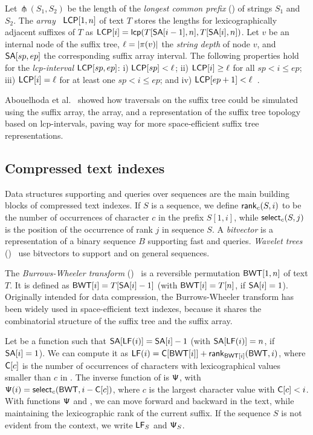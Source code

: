 Let $\mlcp(S_{1}, S_{2})$ be the length of the \emph{longest common prefix}
(\LCP) of strings $S_{1}$ and $S_{2}$. The \LCP{}
\emph{array}~\cite{Manber1993} $\mathsf{LCP}[1,n]$ of text $T$ stores the \LCP{}
lengths for lexicographically adjacent suffixes of $T$ as $\mathsf{LCP}[i] =
\mathsf{lcp}(T[\mathsf{SA}[i-1],n], T[\mathsf{SA}[i],n])$. Let $v$ be an internal node of the
suffix tree, $\ell = \lvert \pi(v) \rvert$ the \emph{string depth} of node $v$, and
$\mathsf{SA}[sp,ep]$ the corresponding suffix array interval. The following
properties hold for the \emph{lcp-interval} $\mathsf{LCP}[sp,ep]$: i) $\mathsf{LCP}[sp] <
\ell$; ii) $\mathsf{LCP}[i] \ge \ell$ for all $sp < i \le ep$; iii) $\mathsf{LCP}[i] = \ell$
for at least one $sp < i \le ep$; and iv) $\mathsf{LCP}[ep+1] <
\ell$~\cite{Abouelhoda2004}.

Abouelhoda et al.~\cite{Abouelhoda2004} showed how traversals on the suffix
tree could be simulated using the suffix array, the \LCP{} array, and a
representation of the suffix tree topology based on lcp-intervals, paving
way for more space-efficient suffix tree representations.

\subsection{Compressed text indexes}

Data structures supporting \rank{} and \select{} queries over sequences are
the main building blocks of compressed text indexes. If $S$ is a sequence, we
define $\mathsf{rank}_{c}(S,i)$ to be the number of occurrences of character $c$ in
the prefix $S[1,i]$, while $\mathsf{select}_{c}(S,j)$ is the position of the occurrence
of rank $j$ in sequence $S$. A \emph{bitvector} is a representation of a
binary sequence $B$ supporting fast \rank{} and \select{} queries.
\emph{Wavelet trees} (\WT)~\cite{Grossi2003} use bitvectors to support \rank{}
and \select{} on general sequences.

The \emph{Burrows-Wheeler transform} (\BWT)~\cite{Burrows1994} is a reversible
permutation $\mathsf{BWT}[1,n]$ of text $T$. It is defined as $\mathsf{BWT}[i] = T[\mathsf{SA}[i] -
1]$ (with $\mathsf{BWT}[i] = T[n]$, if $\textsf{SA}[i] = 1$). Originally intended for data
compression, the Burrows-Wheeler transform has been widely used in
space-efficient text indexes, because it shares the combinatorial structure of
the suffix tree and the suffix array.

Let \LF{} be a function such that $\mathsf{SA}[\mathsf{LF}(i)] = \mathsf{SA}[i] - 1$ (with
$\mathsf{SA}[\mathsf{LF}(i)] = n$, if $\mathsf{SA}[i] = 1$). We can compute it as $\mathsf{LF}(i) =
\mathsf{C}[\mathsf{BWT}[i]] + \mathsf{rank}_{\mathsf{BWT}[i]}(\mathsf{BWT}, i)$, where $\mathsf{C}[c]$ is the number of
occurrences of characters with lexicographical values smaller than $c$ in
\BWT. The inverse function of \LF{} is $\mathsf{\Psi}$, with $\mathsf{\Psi}(i) =
\mathsf{select}_{c}(\mathsf{BWT}, i - \mathsf{C}[c])$, where $c$ is the largest character value
with $\mathsf{C}[c] < i$. With functions $\mathsf{\Psi}$ and \LF, we can move forward and
backward in the text, while maintaining the lexicographic rank of the current
suffix. If the sequence $S$ is not evident from the context, we write $\mathsf{LF}_{S}$
and $\mathsf{\Psi}_{S}$.

